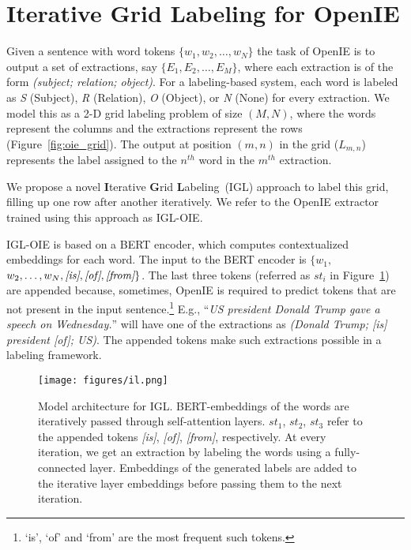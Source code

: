 \documentclass[11pt,a4paper]{article}
\newcommand{\shortname}{{\scshape IGL}}
\newcommand{\boldlongname}{\textbf{I}terative \textbf{G}rid \textbf{L}abeling}
\begin{document}
 

\section{Iterative Grid Labeling for OpenIE}
\label{sec:il}
Given a sentence with word tokens $\{w_1, w_2, \ldots, w_N\}$ the task of OpenIE is to output a set of extractions, say $\{E_1, E_2, \ldots, E_M\}$, where each extraction is of the form \textit{(subject; relation; object)}. For a labeling-based system, each word is labeled as \textit{S} (Subject), \textit{R} (Relation), \textit{O} (Object), or \textit{N} (None) for every extraction. We model this as a  2-D grid labeling problem of size $(M,N)$, where the words represent the columns and the extractions represent the rows (Figure~\ref{fig:oie_grid}). The output at position $(m,n)$ in the grid ($L_{m,n}$) represents the label assigned to the $n^{th}$ word in the $m^{th}$ extraction. 

We propose a novel \boldlongname\ (\shortname) approach to label this grid, filling up one row after another iteratively. We refer to the OpenIE extractor trained using this approach as \shortname-OIE.

\shortname-OIE is based on a BERT encoder, which computes contextualized embeddings for each word. The input to the BERT encoder is $\{w_1,$ $w_2, \ldots, w_N, \emph{[is]}, \emph{[of]}, \emph{[from]}\}$. The last three tokens (referred as $st_i$ in Figure~\ref{fig:model_architecture}) are appended because, sometimes, OpenIE is required to predict tokens that are not present in the input sentence.\footnote{`is', `of' and `from' are the most frequent such tokens.}  E.g., ``\textit{US president Donald Trump gave a speech on Wednesday.}'' will have one of the extractions as \textit{(Donald Trump; [is] president [of]; US)}. The appended tokens make such extractions possible in a labeling framework.

\begin{figure}[t]
\centering
\texttt{[image: figures/il.png]}
\hfill
\vspace*{-3ex}
\caption{Model architecture for \shortname. BERT-embeddings of the words are iteratively passed through self-attention layers. $st_1$, $st_2$, $st_3$ refer to the appended tokens \emph{[is]}, \emph{[of]}, \emph{[from]}, respectively. At every iteration, we get an extraction by labeling the words using a fully-connected layer. Embeddings of the generated labels are added to the iterative layer embeddings before passing them to the next iteration.} 
\label{fig:model_architecture}
\end{figure}
\end{document}
